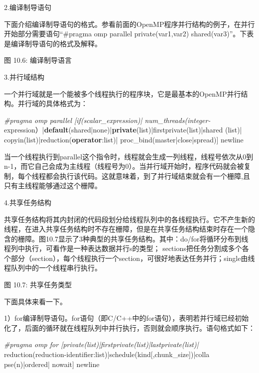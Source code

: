 \documentclass[]{ctexbook}
\newenvironment{Shaded}{\begin{snugshade}}{\end{snugshade}}
\newcommand{\ControlFlowTok}[1]{\textcolor[rgb]{0.13,0.29,0.53}{\textbf{#1}}}
\newcommand{\KeywordTok}[1]{\textcolor[rgb]{0.13,0.29,0.53}{\textbf{#1}}}
\newcommand{\NormalTok}[1]{#1}
\newcommand{\PreprocessorTok}[1]{\textcolor[rgb]{0.56,0.35,0.01}{\textit{#1}}}
\begin{document}
2.编译制导语句

下面介绍编译制导语句的格式。参看前面的OpenMP程序并行结构的例子，在并行开始部分需要语句``\#pragma omp parallel private(var1,var2) shared(var3)''。下表是编译制导语句的格式及解释。

图 10.6: 编译制导语言

3.并行域结构

一个并行域就是一个能被多个线程执行的程序块，它是最基本的OpenMP并行结构。并行域的具体格式为：

\begin{Shaded}
\begin{Highlighting}[]
\PreprocessorTok{\#pragma omp parallel [if(scalar\_expression)| num\_threads(integer{-}}
\NormalTok{expression）|}\ControlFlowTok{default}\NormalTok{(shared|none)|}\KeywordTok{private}\NormalTok{(list)|firstprivate(list)|shared}
\NormalTok{(list)| copyin(list)|reduction(}\KeywordTok{operator}\NormalTok{:list)| }
\NormalTok{proc\_bind(master|close|spread)] }
\NormalTok{newline}
\end{Highlighting}
\end{Shaded}

当一个线程执行到parallel这个指令时，线程就会生成一列线程，线程号依次从0到n-1，而它自己会成为主线程（线程号为0）。当并行域开始时，程序代码就会被复制，每个线程都会执行该代码。这就意味着，到了并行域结束就会有一个栅障,且只有主线程能够通过这个栅障。

4.共享任务结构

共享任务结构将其内封闭的代码段划分给线程队列中的各线程执行。它不产生新的线程，在进入共享任务结构时不存在栅障，但是在共享任务结构结束时存在一个隐含的栅障。图10.7显示了3种典型的共享任务结构。其中：do/for将循环分布到线程列中执行，可看作是一种表达数据并行s的类型； sections把任务分割成多个各个部分（section），每个线程执行一个section，可很好地表达任务并行；single由线程队列中的一个线程串行执行。

图 10.7: 共享任务类型

下面具体来看一下。

1）for编译制导语句。for语句（即C/C++中的for语句），表明若并行域已经初始化了，后面的循环就在线程队列中并行执行，否则就会顺序执行。语句格式如下：

\begin{Shaded}
\begin{Highlighting}[]
\PreprocessorTok{\#pragma omp for [private(list)|firstprivate(list)|lastprivate(list)|}
\NormalTok{reduction(reduction{-}identifier:list)|schedule(kind[,chunk\_size])|colla}
\NormalTok{pse(n)|ordered| nowait] }
\NormalTok{newline}
\end{Highlighting}
\end{Shaded}
\end{document}
